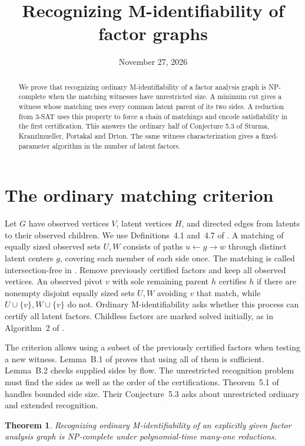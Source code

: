 \documentclass[11pt,a4paper]{amsart}
\title{Recognizing M-identifiability of factor graphs}
\date{November 27, 2026}
\newtheorem{theorem}{Theorem}
\begin{document}
\begin{abstract}
We prove that recognizing ordinary M-identifiability of a factor analysis graph is NP-complete when the matching witnesses have unrestricted size. A minimum cut gives a witness whose matching uses every common latent parent of its two sides. A reduction from 3-SAT uses this property to force a chain of matchings and encode satisfiability in the first certification. This answers the ordinary half of Conjecture 5.3 of Sturma, Kranzlmueller, Portakal and Drton. The same witness characterization gives a fixed-parameter algorithm in the number of latent factors.
\end{abstract}
\maketitle

\section{The ordinary matching criterion}

Let \(G\) have observed vertices \(V\), latent vertices \(H\), and directed edges from latents to their observed children. We use Definitions~4.1 and~4.7 of \cite{source}. A matching of equally sized observed sets \(U,W\) consists of paths \(u\leftarrow g\rightarrow w\) through distinct latent centers \(g\), covering each member of each side once. The matching is called intersection-free in \cite{source}. Remove previously certified factors and keep all observed vertices. An observed pivot \(v\) with sole remaining parent \(h\) certifies \(h\) if there are nonempty disjoint equally sized sets \(U,W\) avoiding \(v\) that match, while \(U\cup\{v\},W\cup\{v\}\) do not. Ordinary M-identifiability asks whether this process can certify all latent factors. Childless factors are marked solved initially, as in Algorithm~2 of \cite{preprint}.

The criterion allows using a subset of the previously certified factors when testing a new witness. Lemma~B.1 of \cite{preprint} proves that using all of them is sufficient. Lemma~B.2 checks supplied sides by flow. The unrestricted recognition problem must find the sides as well as the order of the certifications. Theorem~5.1 of \cite{source} handles bounded side size. Their Conjecture~5.3 asks about unrestricted ordinary and extended recognition.

\begin{theorem}\label{thm:main}
Recognizing ordinary M-identifiability of an explicitly given factor analysis graph is NP-complete under polynomial-time many-one reductions.
\end{theorem}
\end{document}
